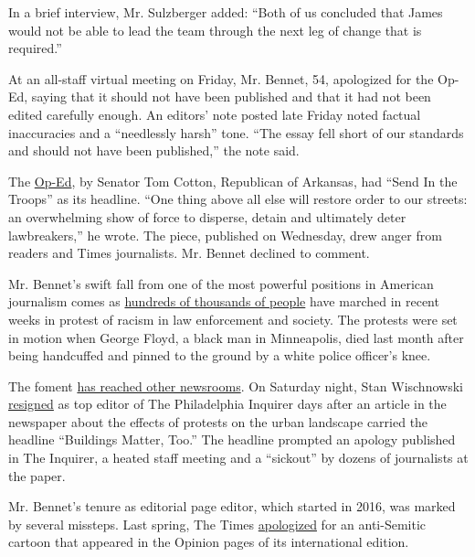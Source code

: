 In a brief interview, Mr. Sulzberger added: ``Both of us concluded that
James would not be able to lead the team through the next leg of change
that is required.''

At an all-staff virtual meeting on Friday, Mr. Bennet, 54, apologized
for the Op-Ed, saying that it should not have been published and that it
had not been edited carefully enough. An editors' note posted late
Friday noted factual inaccuracies and a ``needlessly harsh'' tone. ``The
essay fell short of our standards and should not have been published,''
the note said.

The
\href{https://www.nytimes3xbfgragh.onion/2020/06/03/business/tom-cotton-op-ed.html}{Op-Ed},
by Senator Tom Cotton, Republican of Arkansas, had ``Send In the
Troops'' as its headline. ``One thing above all else will restore order
to our streets: an overwhelming show of force to disperse, detain and
ultimately deter lawbreakers,'' he wrote. The piece, published on
Wednesday, drew anger from readers and Times journalists. Mr. Bennet
declined to comment.

Mr. Bennet's swift fall from one of the most powerful positions in
American journalism comes as
\href{https://www.nytimes3xbfgragh.onion/2020/06/07/us/protests-today-george-floyd-video.html}{hundreds
of thousands of people} have marched in recent weeks in protest of
racism in law enforcement and society. The protests were set in motion
when George Floyd, a black man in Minneapolis, died last month after
being handcuffed and pinned to the ground by a white police officer's
knee.

The foment
\href{https://www.nytimes3xbfgragh.onion/2020/06/07/business/media/inside-the-revolts-erupting-in-americas-big-newsrooms.html}{has
reached other newsrooms}. On Saturday night, Stan Wischnowski
\href{https://www.nytimes3xbfgragh.onion/2020/06/06/business/media/editor-philadephia-inquirer-resigns.html}{resigned}
as top editor of The Philadelphia Inquirer days after an article in the
newspaper about the effects of protests on the urban landscape carried
the headline ``Buildings Matter, Too.'' The headline prompted an apology
published in The Inquirer, a heated staff meeting and a ``sickout'' by
dozens of journalists at the paper.

Mr. Bennet's tenure as editorial page editor, which started in 2016, was
marked by several missteps. Last spring, The Times
\href{https://www.nytimes3xbfgragh.onion/2019/04/28/business/ny-times-anti-semitic-cartoon.html}{apologized}
for an anti-Semitic cartoon that appeared in the Opinion pages of its
international edition.


